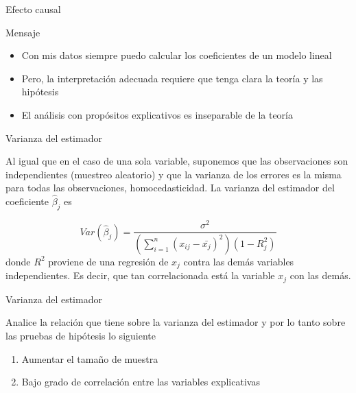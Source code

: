 \documentclass{beamer}
\begin{document}
\begin{frame}{Efecto causal}

Mensaje

\begin{itemize}
    \item Con mis datos siempre puedo calcular los coeficientes de un modelo lineal
    \item Pero, la interpretación adecuada requiere que tenga clara la teoría y las hipótesis
    \item El análisis con propósitos explicativos es inseparable de la teoría
\end{itemize}
    
\end{frame}

\begin{frame}{Varianza del estimador}

Al igual que en el caso de una sola variable, suponemos que las observaciones son independientes (muestreo aleatorio) y que la varianza de los errores es la misma para todas las observaciones, homocedasticidad. La varianza del estimador del coeficiente $\hat{\beta}_j$ es

\begin{equation*}
    Var(\hat{\beta}_j)=\dfrac{\sigma^2}{(\sum_{i=1}^n (x_{ij}-\bar{x_j})^2)(1-R^2_j)}
\end{equation*}
    donde $R^2$ proviene de una regresión de $x_j$ contra las demás variables independientes. Es decir, que tan correlacionada está la variable $x_j$ con las demás. 
\end{frame}


\begin{frame}{Varianza del estimador}

Analice la relación que tiene sobre la varianza del estimador y por lo tanto sobre las pruebas de hipótesis lo siguiente

\begin{enumerate}
    \item Aumentar el tamaño de muestra
    \item Bajo grado de correlación entre las variables explicativas
\end{enumerate}
    
\end{frame}
\end{document}
